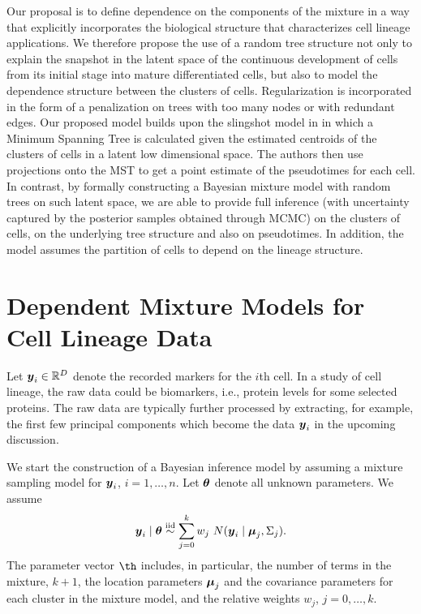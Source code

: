 Our proposal is to define dependence on the components of the mixture in a way that explicitly incorporates the biological structure that characterizes cell lineage applications. 
We therefore propose the use of a random tree structure not only to explain the snapshot in the latent space of the continuous development of cells from its initial stage into mature differentiated cells, but also to model the dependence structure between the clusters of cells.
Regularization is incorporated in the form of a penalization on trees with too many nodes or with redundant edges. 
Our proposed model builds upon the slingshot model in \cite{street2018} in which a Minimum Spanning Tree is calculated given the estimated centroids of the clusters of cells in a latent low dimensional space. The authors then use projections onto the MST to get a point estimate of the pseudotimes for each cell. 
In contrast, by formally constructing a Bayesian mixture model with random trees on such latent space, we are able to provide full inference (with uncertainty captured by the posterior samples obtained through MCMC) on the clusters of cells, on the underlying tree structure and also on pseudotimes. In addition, the model assumes the partition of cells to depend on the lineage structure.

\section{Dependent  Mixture Models for Cell Lineage Data}


Let $\mbox{\boldmath $y$}_i \in \mathbb{R}^D$ denote the recorded markers for the $i$th cell. 
In a study of cell lineage, the raw data could be biomarkers, i.e., protein levels for some selected proteins. 
The raw data are typically further processed by extracting, for example, the first few principal components which become the data $\mbox{\boldmath $y$}_i$ in the upcoming discussion.

We start the construction of a Bayesian inference model by assuming a mixture sampling model for $\mbox{\boldmath $y$}_i$, $i=1, \ldots, n$. 
Let $\mbox{\boldmath $\theta$}$ denote all unknown parameters. 
We assume
\begin{equation}
	  \mbox{\boldmath $y$}_i \mid \mbox{\boldmath $\theta$} \stackrel{\mbox{\scriptsize iid}}{\sim} \sum_{j=0}^k w_j \ N(\mbox{\boldmath $y$}_i  \mid \mbox{\boldmath $\mu$}_j, \Sigma_j).
	\label{eq:likelihood}
\end{equation}
The parameter vector $\th$ includes, in particular, the number of terms in the mixture, $k+1$, the location parameters $\mbox{\boldmath $\mu$}_j$ and the covariance parameters for each cluster in the mixture model, and the relative weights $w_j$, $j=0, \ldots, k$.

